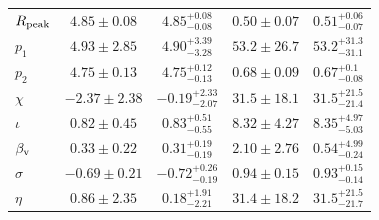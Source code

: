 \documentclass[linenumbers, twocolumn, tighten]{aastex701}
\begin{document}
\begin{table}[ht!]
\begin{tabular}{l|cccc}
 \\
$R_{\rm peak}$ & $4.85\pm0.08$ & $4.85^{+0.08}_{-0.08}$ & $0.50 \pm 0.07$ & $0.51^{+0.06}_{-0.07}$
 \\
$p_1$ & $4.93\pm2.85$ & $4.90^{+3.39}_{-3.28}$
 & $53.2 \pm 26.7$ & $53.2^{+31.3}_{-31.1}$
 \\
$p_2$ & $4.75\pm0.13$ & $4.75^{+0.12}_{-0.13}$
 & $0.68 \pm 0.09$ & $0.67^{+0.1}_{-0.08}$
 \\
$\chi$ & $-2.37 \pm 2.38$ & $-0.19^{+2.33}_{-2.07}$
 & $31.5 \pm 18.1$ & $31.5^{+21.5}_{-21.4}$
 \\
$\iota$ & $0.82 \pm 0.45$ & $0.83^{+0.51}_{-0.55}$ & $8.32 \pm 4.27$ & $8.35^{+4.97}_{-5.03}$
 \\
$\beta_{\rm v}$ & $0.33 \pm 0.22$ & $0.31^{+0.19}_{-0.19}$
 & $2.10 \pm 2.76$ & $0.54^{+4.99}_{-0.24}$
 \\
$\sigma$ & $-0.69 \pm 0.21$ & $-0.72^{+0.26}_{-0.19}$ & $0.94 \pm 0.15$ & $0.93^{+0.15}_{-0.14}$
 \\
$\eta$ & $0.86 \pm 2.35$ & $0.18^{+1.91}_{-2.21}$ & $31.4 \pm 18.2$ & $31.5^{+21.5}_{-21.7}$
 \\
\hline
\end{tabular}
\end{table}
\end{document}
